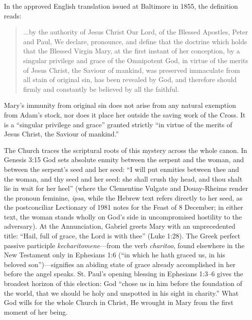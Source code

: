 In the approved English translation issued at Baltimore in 1855, the definition reads:

\begin{quote}\small
...by the authority of Jesus Christ Our Lord, of the Blessed Apostles, Peter and Paul, We declare, pronounce, and define that the doctrine which holds that the Blessed Virgin Mary, at the first instant of her conception, by a singular privilege and grace of the Omnipotent God, in virtue of the merits of Jesus Christ, the Saviour of mankind, was preserved immaculate from all stain of original sin, has been revealed by God, and therefore should firmly and constantly be believed by all the faithful.
\end{quote}

Mary's immunity from original sin does not arise from any natural exemption from Adam's stock, nor does it place her outside the saving work of the Cross. It is a ``singular privilege and grace'' granted strictly ``in virtue of the merits of Jesus Christ, the Saviour of mankind.''

The Church traces the scriptural roots of this mystery across the whole canon. In Genesis 3:15 God sets absolute enmity between the serpent and the woman, and between the serpent's seed and her seed: ``I will put enmities between thee and the woman, and thy seed and her seed: she shall crush thy head, and thou shalt lie in wait for her heel'' (where the Clementine Vulgate and Douay-Rheims render the pronoun feminine, \textit{ipsa}, while the Hebrew text refers directly to her seed, as the postconciliar Lectionary of 1981 notes for the Feast of 8 December; in either text, the woman stands wholly on God's side in uncompromised hostility to the adversary). At the Annunciation, Gabriel greets Mary with an unprecedented title: ``Hail, full of grace, the Lord is with thee'' (Luke 1:28). The Greek perfect passive participle \textit{kecharitomene}---from the verb \textit{charitoo}, found elsewhere in the New Testament only in Ephesians 1:6 (``in which he hath graced us, in his beloved son'')---signifies an abiding state of grace already accomplished in her before the angel speaks. St. Paul's opening blessing in Ephesians 1:3--6 gives the broadest horizon of this election: God ``chose us in him before the foundation of the world, that we should be holy and unspotted in his sight in charity.'' What God wills for the whole Church in Christ, He wrought in Mary from the first moment of her being.

